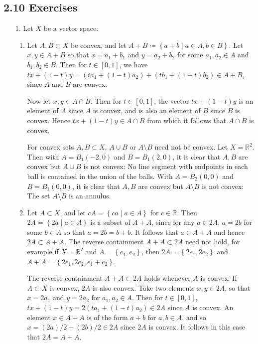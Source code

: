 \documentclass[11pt,leqno]{article}
\theoremstyle{plain}
\theoremstyle{definition}
\numberwithin{equation}{section}
\numberwithin{lem}{section}
\newcommand{\cbr}[1]{\left\{#1\right\}}
\begin{document}
\subsection*{2.10 Exercises}
\begin{enumerate}
  \item[1.] Let $X$ be a vector space.
  \begin{enumerate}
    \item Let $A,B\subset X$ be convex, and let $A+B \coloneqq \cbr{a+b\mid a\in A,b\in B}$. Let $x,y\in A+B$ so that $x = a_1+b_1$ and $y = a_2+b_2$ for some $a_1,a_2\in A$ and $b_1,b_2\in B$. Then for $t\in [0,1]$, we have $tx+(1-t)y = (ta_1 + (1-t)a_2) + (tb_1 + (1-t)b_2)\in A+B$, since $A$ and $B$ are convex.
    
    Now let $x,y\in A\cap B$. Then for $t\in [0,1]$, the vector $tx + (1-t)y$ is an element of $A$ since $A$ is convex, and is also an element of $B$ since $B$ is convex. Hence $tx + (1-t)y\in A\cap B$ from which it follows that $A\cap B$ is convex.

    For convex sets $A,B\subset X$, $A\cup B$ or $A\setminus B$ need not be convex. Let $X = \mathbb R^2$. Then with $A = B_1(-2,0)$ and $B = B_1(2,0)$, it is clear that $A,B$ are convex but $A\cup B$ is not convex: No line segment with endpoints in each ball is contained in the union of the balls. With $A = B_2(0,0)$ and $B = B_1(0,0)$, it is clear that $A,B$ are convex but $A\setminus B$ is not convex: The set $A\setminus B$ is an annulus.

    \item Let $A\subset X$, and let $cA = \cbr{ca\mid a\in A}$ for $c\in \mathbb R$. Then $2A = \cbr{2a\mid a\in A}$ is a subset of $A + A$, since for any $a\in 2A$, $a = 2b$ for some $b\in A$ so that $a = 2b = b+b$. It follows that $a \in A+A$ and hence $2A\subset A + A$. The reverse containment $A + A\subset 2A$ need not hold, for example if $X = \mathbb R^2$ and $A = \cbr{e_1,e_2}$, then $2A = \cbr{2e_1,2e_2}$ and $A + A =\cbr{2e_1, 2e_2, e_1 + e_2}$.
    
    The reverse containment $A + A\subset 2A$ holds whenever $A$ is convex: If $A\subset X$ is convex, $2A$ is also convex. Take two elements $x,y\in 2A$, so that $x = 2a_1$ and $y = 2a_2$ for $a_1,a_2\in A$. Then for $t\in [0,1]$, $tx+(1-t)y = 2(ta_1 + (1-t)a_2)\in 2A$ since $A$ is convex. An element $x \in A+A$ is of the form $a+b$ for $a,b\in A$, and so $x = (2a)/2 + (2b)/2\in 2A$ since $2A$ is convex. It follows in this case that $2A = A + A$.
  \end{enumerate}


\end{enumerate}
\end{document}
